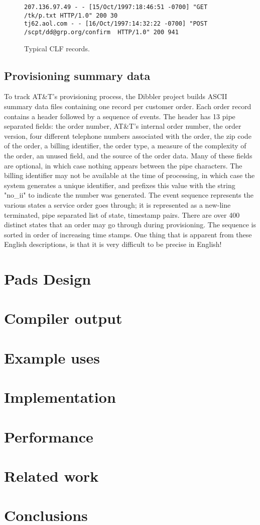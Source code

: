 \documentclass{sig-alternate}
\begin{document}
\begin{figure*}
\begin{small}
\begin{verbatim}
207.136.97.49 - - [15/Oct/1997:18:46:51 -0700] "GET /tk/p.txt HTTP/1.0" 200 30
tj62.aol.com - - [16/Oct/1997:14:32:22 -0700] "POST /scpt/dd@grp.org/confirm  HTTP/1.0" 200 941
\end{verbatim}
\label{figure:clf-records}
\caption{Typical CLF records.}
\end{small}
\end{figure*}

\subsection{Provisioning summary data}
To track AT\&T's provisioning process, the Dibbler project builds ASCII summary data files containing one record per customer order.   Each order record contains a header followed by a sequence of events.  The header has 13 pipe separated fields: the order number, AT\&T's internal order number, the order version, four different telephone numbers associated with the order, the zip code of the order, a billing identifier, the order type, a measure of the complexity of the order, an unused field, and the source of the order data.  Many of these fields are optional, in which case nothing appears between the pipe characters.   The billing identifier may not be available at the time of processing, in which case the system generates a unique identifier, and prefixes this value with the string "no_ii" to indicate the number was generated. The event sequence represents the various states a service order goes through;  it is represented as a new-line terminated, pipe separated list of state, timestamp pairs.  
There are over 400 distinct states that an order may go through during provisioning.  The sequence is sorted in order of increasing time stamps.
One thing that is apparent from these English descriptions, is that it is very difficult to be precise in English!


\section{Pads Design}
\section{Compiler output}
\section{Example uses}
\section{Implementation}
\section{Performance}
\section{Related work}
\section{Conclusions}

 
\end{document}
